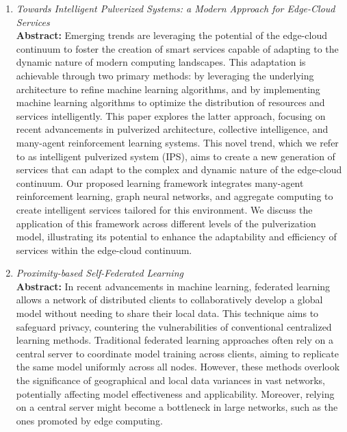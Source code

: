 \documentclass[runningheads]{llncs}
\begin{document}
\begin{enumerate}
    \item \emph{Towards Intelligent Pulverized Systems: a Modern Approach for Edge-Cloud Services}~\cite{DBLP:conf/woa/DominiFAV24} \\
    \textbf{Abstract: }
    Emerging trends are leveraging the potential of the edge-cloud continuum to foster the creation of smart services capable of adapting to the 
     dynamic nature of modern computing landscapes. 
     This adaptation is achievable through two primary methods: by leveraging the underlying architecture to refine machine learning algorithms, 
      and by implementing machine learning algorithms to optimize the distribution of resources and services intelligently. 
    This paper explores the latter approach, focusing on recent advancements in pulverized architecture, collective intelligence, and many-agent 
     reinforcement learning systems. 
    This novel trend, which we refer to as intelligent pulverized system (IPS), aims to create a new generation of services that can adapt to the 
     complex and dynamic nature of the edge-cloud continuum. Our proposed learning framework integrates many-agent reinforcement learning, graph neural 
     networks, and aggregate computing to create intelligent services tailored for this environment. 
    We discuss the application of this framework across different levels of the pulverization model, illustrating its potential to enhance 
     the adaptability and efficiency of services within the edge-cloud continuum.
    \item \emph{Proximity-based Self-Federated Learning}~\cite{DBLP:conf/acsos/DominiFAVE24} \\
    \textbf{Abstract: }
    In recent advancements in machine learning, federated learning allows a network of distributed clients to collaboratively develop a global model 
     without needing to share their local data. 
    This technique aims to safeguard privacy, countering the vulnerabilities of conventional centralized learning methods. 
    Traditional federated learning approaches often rely on a central server to coordinate model training across clients, aiming to replicate 
     the same model uniformly across all nodes. 
    However, these methods overlook the significance of geographical and local data variances in vast networks, potentially affecting model 
     effectiveness and applicability. 
    Moreover, relying on a central server might become a bottleneck in large networks, such as the ones promoted by edge computing. 

\end{enumerate}
\end{document}
